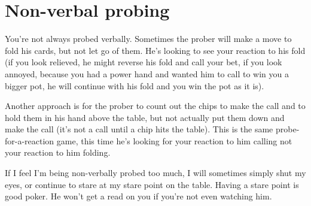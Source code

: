 \section{Non-verbal probing}

You're not always probed verbally. Sometimes the prober
will make a move to fold his cards, but not let go of them. He's looking
to see your reaction to his fold (if you look relieved, he might reverse
his fold and call your bet, if you look annoyed, because you had a power
hand and wanted him to call to win you a bigger pot, he will continue
with his fold and you win the pot as it is).

Another approach is for the prober to count out the chips to make
the call and to hold them in his hand above the table, but not
actually put them down and make the call (it's not a call until a chip
hits the table). This is the same probe-for-a-reaction game, this time
he's looking for your reaction to him calling not your reaction to him
folding.

If I feel I'm being non-verbally probed too much, I will sometimes
simply shut my eyes, or continue to stare at my stare point on the
table. Having a stare point is good poker. He won't get a read on
you if you're not even watching him.

